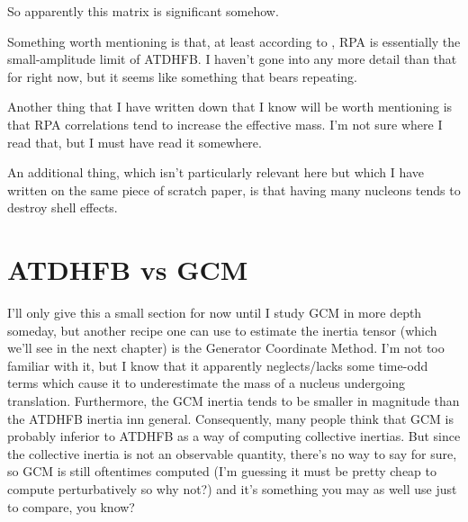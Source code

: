 So apparently this matrix is significant somehow.

Something worth mentioning is that, at least according to \cite{Baranger1978}, RPA is essentially the small-amplitude limit of ATDHFB. I haven't gone into any more detail than that for right now, but it seems like something that bears repeating.

Another thing that I have written down that I know will be worth mentioning is that RPA correlations tend to increase the effective mass. I'm not sure where I read that, but I must have read it somewhere.

An additional thing, which isn't particularly relevant here but which I have written on the same piece of scratch paper, is that having many nucleons tends to destroy shell effects.

\section*{ATDHFB vs GCM}

I'll only give this a small section for now until I study GCM in more depth someday, but another recipe one can use to estimate the inertia tensor (which we'll see in the next chapter) is the Generator Coordinate Method. I'm not too familiar with it, but I know that it apparently neglects/lacks some time-odd terms which cause it to underestimate the mass of a nucleus undergoing translation. Furthermore, the GCM inertia tends to be smaller in magnitude than the ATDHFB inertia inn general. Consequently, many people think that GCM is probably inferior to ATDHFB as a way of computing collective inertias. But since the collective inertia is not an observable quantity, there's no way to say for sure, so GCM is still oftentimes computed (I'm guessing it must be pretty cheap to compute perturbatively so why not?) and it's something you may as well use just to compare, you know?
